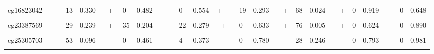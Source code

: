 \documentclass[11pt,oneside]{bristolthesis}
\begin{document}
\begin{landscape}
\begin{table}[!h]
{\begin{tabular}[t]{llllllllllllllllllllll}
cg16823042 & {-}{-}{-}{-} & 13 & 0.330 & {-}{-}{+}{-} & 0 & 0.482 & {-}{-}{+}{-} & 0 & 0.554 & {+}{-}{+}{-} & 19 & 0.293 & {-}{-}{-}{+} & 68 & 0.024 & {-}{-}{-}{+} & 0 & 0.919 & {-}{-}{-} & 0 & 0.648\\
\addlinespace
\cellcolor{gray!6}{cg21566642} & \cellcolor{gray!6}{{-}{-}{-}{-}} & \cellcolor{gray!6}{46} & \cellcolor{gray!6}{0.136} & \cellcolor{gray!6}{{-}{-}{-}{-}} & \cellcolor{gray!6}{38} & \cellcolor{gray!6}{0.184} & \cellcolor{gray!6}{{-}{-}{-}{-}} & \cellcolor{gray!6}{18} & \cellcolor{gray!6}{0.300} & \cellcolor{gray!6}{{+}{-}{+}{+}} & \cellcolor{gray!6}{0} & \cellcolor{gray!6}{0.681} & \cellcolor{gray!6}{{-}{-}{-}{-}} & \cellcolor{gray!6}{0} & \cellcolor{gray!6}{0.798} & \cellcolor{gray!6}{{-}{-}{-}{-}} & \cellcolor{gray!6}{65} & \cellcolor{gray!6}{0.035} & \cellcolor{gray!6}{{-}{-}{-}} & \cellcolor{gray!6}{69} & \cellcolor{gray!6}{0.040}\\
cg23387569 & {-}{-}{-}{-} & 29 & 0.239 & {-}{-}{+}{-} & 35 & 0.204 & {-}{-}{+}{-} & 22 & 0.279 & {-}{-}{+}{-} & 0 & 0.633 & {-}{-}{-}{+} & 76 & 0.005 & {-}{-}{-}{+} & 0 & 0.624 & {-}{-}{-} & 0 & 0.890\\
\cellcolor{gray!6}{cg23771366} & \cellcolor{gray!6}{{-}{-}{-}{-}} & \cellcolor{gray!6}{42} & \cellcolor{gray!6}{0.161} & \cellcolor{gray!6}{{-}{-}{-}{-}} & \cellcolor{gray!6}{75} & \cellcolor{gray!6}{0.007} & \cellcolor{gray!6}{{-}{-}{-}{-}} & \cellcolor{gray!6}{72} & \cellcolor{gray!6}{0.013} & \cellcolor{gray!6}{{+}{+}{+}{+}} & \cellcolor{gray!6}{0} & \cellcolor{gray!6}{0.805} & \cellcolor{gray!6}{{-}{-}{-}{-}} & \cellcolor{gray!6}{0} & \cellcolor{gray!6}{0.518} & \cellcolor{gray!6}{{-}{-}{-}{+}} & \cellcolor{gray!6}{27} & \cellcolor{gray!6}{0.249} & \cellcolor{gray!6}{{+}{-}{-}} & \cellcolor{gray!6}{81} & \cellcolor{gray!6}{0.006}\\
cg25305703 & {-}{-}{-}{-} & 53 & 0.096 & {-}{-}{-}{-} & 0 & 0.461 & {-}{-}{-}{-} & 4 & 0.373 & {-}{-}{-}{-} & 0 & 0.780 & {-}{-}{-}{-} & 28 & 0.246 & {-}{-}{-}{-} & 0 & 0.793 & {-}{-}{-} & 0 & 0.981\\
\cellcolor{gray!6}{cg26963277} & \cellcolor{gray!6}{{-}{-}{-}{-}} & \cellcolor{gray!6}{0} & \cellcolor{gray!6}{0.512} & \cellcolor{gray!6}{{-}{-}{-}{-}} & \cellcolor{gray!6}{0} & \cellcolor{gray!6}{0.516} & \cellcolor{gray!6}{{-}{-}{-}{-}} & \cellcolor{gray!6}{0} & \cellcolor{gray!6}{0.430} & \cellcolor{gray!6}{{-}{-}{+}{+}} & \cellcolor{gray!6}{53} & \cellcolor{gray!6}{0.095} & \cellcolor{gray!6}{{-}{-}{-}{+}} & \cellcolor{gray!6}{0} & \cellcolor{gray!6}{0.466} & \cellcolor{gray!6}{{-}{-}{-}{-}} & \cellcolor{gray!6}{17} & \cellcolor{gray!6}{0.308} & \cellcolor{gray!6}{{-}{-}{-}} & \cellcolor{gray!6}{10} & \cellcolor{gray!6}{0.329}\\

\end{tabular}}
\end{table}
\end{landscape}
\end{document}
